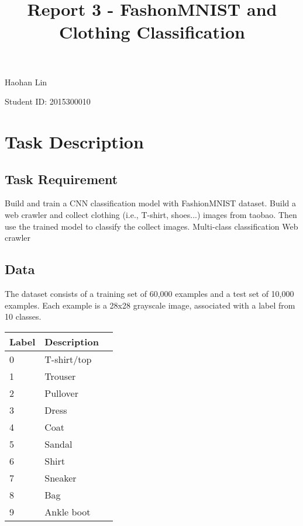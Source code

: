 \documentclass[11pt]{article}
\title{Report 3  -  FashonMNIST  and Clothing Classification}
\begin{document}
    
    
    \maketitle
    
    

    
    \centerline{Haohan Lin}

 \centerline{Student ID: 2015300010}

    \section{Task Description}\label{task-description}

    \subsection{Task Requirement}\label{task-requirement}

Build and train a CNN classification model with FashionMNIST dataset.
Build a web crawler and collect clothing (i.e., T-shirt, shoes...)
images from taobao. Then use the trained model to classify the collect
images. \newline * Multi-class classification \newline * Web crawler

    \subsection{Data}\label{data}

The dataset consists of a training set of 60,000 examples and a test set
of 10,000 examples. Each example is a 28x28 grayscale image, associated
with a label from 10 classes.

    \begin{longtable}[]{@{}lll@{}}
\toprule
Label & Description &\tabularnewline
\midrule
\endhead
0 & T-shirt/top &\tabularnewline
1 & Trouser &\tabularnewline
2 & Pullover &\tabularnewline
3 & Dress &\tabularnewline
4 & Coat &\tabularnewline
5 & Sandal &\tabularnewline
6 & Shirt &\tabularnewline
7 & Sneaker &\tabularnewline
8 & Bag &\tabularnewline
9 & Ankle boot &\tabularnewline
\bottomrule
\end{longtable}
\end{document}
